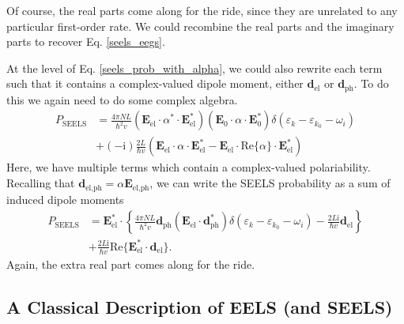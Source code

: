 \documentclass [11pt, proquest] {uwthesis}[2016/11/22]
\begin{document}
Of course, the real parts come along for the ride, since they are unrelated to any particular first-order rate. We could recombine the real parts and the imaginary parts to recover Eq. \ref{seels_eegs}. 

At the level of Eq. \ref{seels_prob_with_alpha}, we could also rewrite each term such that it contains a complex-valued dipole moment, either $\textbf{d}_{\textrm{el}}$ or $\textbf{d}_{\textrm{ph}}$. To do this we again need to do some complex algebra.
\begin{equation}
\begin{aligned}
P_{\textrm{SEELS}} &= \frac{4\pi NL}{\hbar^2v}(\textbf{E}_{\textrm{el}}\cdot\alpha^*\cdot\textbf{E}_{\textrm{el}}^*)(\textbf{E}_0\cdot\alpha\cdot\textbf{E}_0^*)\delta(\varepsilon_k - \varepsilon_{k_0}-\omega_i)\\
  &+ (-\textrm{i})\frac{2L}{\hbar v}(\textbf{E}_{\textrm{el}}\cdot\alpha\cdot\textbf{E}_{\textrm{el}}^*-\textbf{E}_{\textrm{el}}\cdot\textrm{Re}\{\alpha\}\cdot\textbf{E}_{\textrm{el}}^*)
  \label{real_alphas}
\end{aligned}
\end{equation}
Here, we have multiple terms which contain a complex-valued polariability. Recalling that $\textbf{d}_{\textrm{el,ph}} = \alpha\textbf{E}_{\textrm{el,ph}}$, we can write the SEELS probability as a sum of induced dipole moments
\begin{equation}
\begin{aligned}
P_{\textrm{SEELS}} &= \textbf{E}_{\textrm{el}}^*\cdot\left\{\frac{4\pi NL}{\hbar^2v}\textbf{d}_{\textrm{ph}}(\textbf{E}_{\textrm{el}}\cdot\textbf{d}_{\textrm{ph}}^*)\delta(\varepsilon_k - \varepsilon_{k_0}-\omega_i) - \frac{2L\textrm{i}}{\hbar v}\textbf{d}_{\textrm{el}}\right\}\\
  &+ \frac{2L\textrm{i}}{\hbar v}\textrm{Re}\{\textbf{E}_{\textrm{el}}^*\cdot\textbf{d}_{\textrm{el}}\}.
  \label{seels_dipoles}
\end{aligned}
\end{equation}
Again, the extra real part comes along for the ride.

\subsection{A Classical Description of EELS (and SEELS)}
\end{document}
